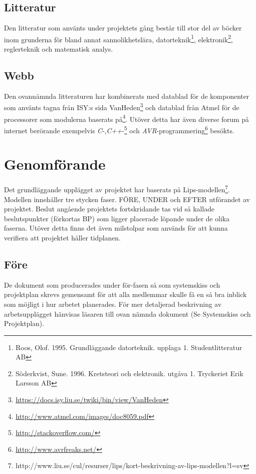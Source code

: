 \documentclass[a4paper,12pt,fleqn]{article}
\begin{document}
\subsection{Litteratur}
Den litteratur som använts under projektets gång består till stor del av böcker inom grunderna för bland annat sannolikhetslära, datorteknik\footnote{Roos, Olof. 1995. Grundläggande datorteknik. upplaga 1. Studentlitteratur AB}, elektronik\footnote{Söderkvist, Sune. 1996. Kretsteori och elektronik. utgåva 1. Tryckeriet Erik Larsson AB}, reglerteknik och matematisk analys.

\subsection{Webb}
Den ovannämnda litteraturen har kombinerats med datablad för de komponenter som använts tagna från ISY:s sida VanHeden\footnote{\url{https://docs.isy.liu.se/twiki/bin/view/VanHeden}} och datablad från Atmel för de processorer som modulerna baserats på\footnote{\url{http://www.atmel.com/images/doc8059.pdf}}. 
Utöver detta har även diverse forum på internet berörande exempelvis \emph{C}-,\emph{C++}-\footnote{\url{http://stackoverflow.com/}} och \emph{AVR}-programmering\footnote{\url{http://www.avrfreaks.net/}} besökts.


\section{Genomförande}

Det grundläggande upplägget av projektet har baserats på Lips-modellen\footnote{http://www.liu.se/cul/resurser/lips/kort-beskrivning-av-lips-modellen?l=sv}. Modellen innehåller tre stycken faser. FÖRE, UNDER och EFTER utförandet av projektet. Beslut angående projektets fortskridande tas vid så kallade beslutspunkter (förkortas BP) som ligger placerade löpande under de olika faserna. Utöver detta finns det även milstolpar som används för att kunna verifiera att projektet håller tidplanen. 

\subsection{Före}
De dokument som producerades under för-fasen så som systemskiss och projektplan skrevs gemensamt för att alla medlemmar skulle få en så bra inblick som möjligt i hur arbetet planerades. För mer detaljerad beskrivning av arbetsupplägget hänvisas läsaren till ovan nämnda dokument (Se Systemskiss och Projektplan).
\end{document}
